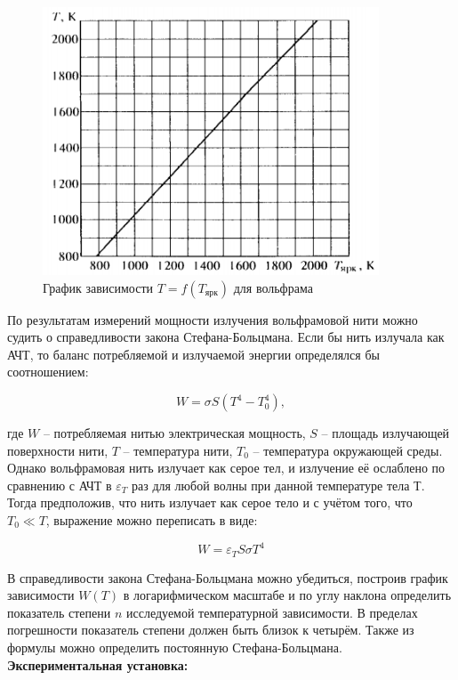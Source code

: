 \documentclass[a4paper, 12pt]{article}%
\begin{document}
\begin{figure}[ht]
    \centering
    \includegraphics[width=10cm]{График1.PNG}
    \caption{График зависимости $T = f(T_{\text{ярк}})$ для вольфрама}
\end{figure}

\newpage

По результатам измерений мощности излучения вольфрамовой нити можно судить о справедливости закона Стефана-Больцмана.  Если бы нить излучала как АЧТ, то баланс потребляемой и излучаемой энергии определялся бы соотношением:

\[ W = \sigma S (T^4 - T_0^4),\]

где $W$ -- потребляемая нитью электрическая мощность,  $S$ -- площадь излучающей поверхности нити,  $T$ -- температура нити,  $T_0$ -- температура окружающей среды.  Однако вольфрамовая нить излучает как серое тел,  и излучение её ослаблено по сравнению с АЧТ в $\varepsilon_T$ раз для любой волны при данной температуре тела Т.  Тогда предположив, что нить излучает как серое тело и с учётом того, что $T_0 \ll T$, выражение можно переписать в виде:

\[W = \varepsilon_T S \sigma T^4\]
    
В справедливости закона Стефана-Больцмана можно убедиться, построив график зависимости $W(T)$ в логарифмическом масштабе и по углу наклона определить показатель степени $n$ исследуемой температурной зависимости. В пределах погрешности показатель степени должен быть близок к четырём.  Также из формулы  можно определить постоянную Стефана-Больцмана.\\

\textbf{Экспериментальная установка:}
\end{document}
